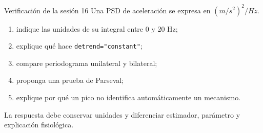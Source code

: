 \documentclass[
  ignorenonframetext,
  aspectratio=169,
  spanish,
]{beamer}
\providecommand{\tightlist}{%
  \setlength{\itemsep}{0pt}\setlength{\parskip}{0pt}}
\begin{document}
\begin{frame}[fragile]{Verificación de la sesión 16}
  \protect{}\label{verificaciuxf3n-de-la-sesiuxf3n-16}
  Una PSD de aceleración se expresa en \((m/s^2)^2/Hz\).

  \begin{enumerate}
    \tightlist
    \item
          indique las unidades de su integral entre 0 y 20 Hz;
    \item
          explique qué hace \texttt{detrend="constant"};
    \item
          compare periodograma unilateral y bilateral;
    \item
          proponga una prueba de Parseval;
    \item
          explique por qué un pico no identifica automáticamente un mecanismo.
  \end{enumerate}

  \begin{tcolorbox}[enhanced jigsaw, arc=.35mm, bottomrule=.15mm, bottomtitle=1mm, breakable, colback=white, colbacktitle=quarto-callout-tip-color!10!white, colframe=quarto-callout-tip-color-frame, coltitle=black, left=2mm, leftrule=.75mm, opacityback=0, opacitybacktitle=0.6, rightrule=.15mm, title=\textcolor{quarto-callout-tip-color}{\faLightbulb}\hspace{0.5em}{Criterio de logro}, titlerule=0mm, toprule=.15mm, toptitle=1mm]

    La respuesta debe conservar unidades y diferenciar estimador, parámetro
    y explicación fisiológica.

  \end{tcolorbox}
\end{frame}
\end{document}
